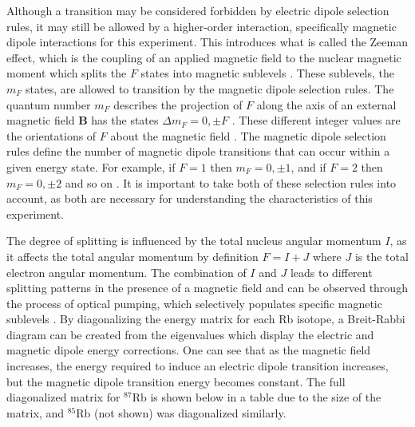 \documentclass[
 reprint,
linenumbers,
aps,amsmath
]{revtex4-2}
\begin{document}
Although a transition may be considered forbidden by electric dipole selection rules, it may still be allowed by a higher-order interaction, specifically magnetic dipole interactions for this experiment. This introduces what is called the Zeeman effect, which is the coupling of an applied magnetic field to the nuclear magnetic moment which splits the $F$ states into magnetic sublevels \cite{McIntyre-QM_Zeeman}. These sublevels, the $m_F$ states, are allowed to transition by the magnetic dipole selection rules. The quantum number $m_F$ describes the projection of $F$ along the axis of an external magnetic field $\mathbf{B}$ has the states $\Delta m_F = 0, \pm F$ \cite{melissinos-mod-phys}. These different integer values are the orientations of $F$ about the magnetic field \cite{melissinos-mod-phys}. The magnetic dipole selection rules define the number of magnetic dipole transitions that can occur within a given energy state. For example, if $F=1$ then $m_F=0,\pm1$, and if $F=2$ then $m_F=0,\pm2$ and so on \cite{Foot_AtomicPhys}. It is important to take both of these selection rules into account, as both are necessary for understanding the characteristics of this experiment. 

The degree of splitting is influenced by the total nucleus angular momentum $I$, as it affects the total angular momentum by definition $F=I+J$ where $J$ is the total electron angular momentum. The combination of \(I\) and \(J\) leads to different splitting patterns in the presence of a magnetic field and can be observed through the process of optical pumping, which selectively populates specific magnetic sublevels \cite{McIntyre-QM_Zeeman, Optical_Pumping_Happer}. By diagonalizing the energy matrix for each Rb isotope, a Breit-Rabbi diagram can be created from the eigenvalues which display the electric and magnetic dipole energy corrections. One can see that as the magnetic field increases, the energy required to induce an electric dipole transition increases, but the magnetic dipole transition energy becomes constant. The full diagonalized matrix for $^{87}\mathrm{Rb}$ is shown below in a table due to the size of the matrix, and $^{85}\mathrm{Rb}$ (not shown) was diagonalized similarly.
\end{document}
